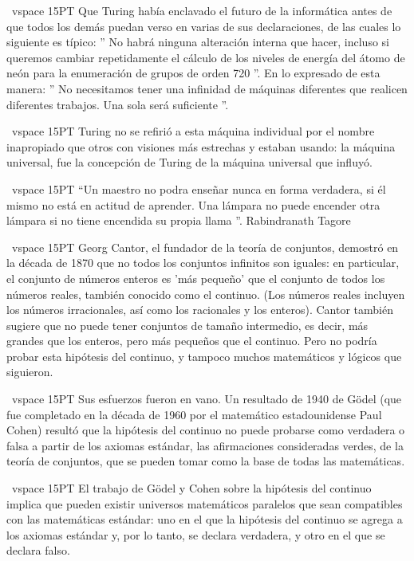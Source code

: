 \ vspace {15PT}
Que Turing había enclavado el futuro de la informática antes de que todos los demás puedan verso en varias de sus declaraciones, de las cuales lo siguiente es típico: '' No habrá ninguna alteración interna que hacer, incluso si queremos cambiar repetidamente el cálculo de los niveles de energía del átomo de neón para la enumeración de grupos de orden 720 ''. En lo expresado de esta manera: '' No necesitamos tener una infinidad de máquinas diferentes que realicen diferentes trabajos. Una sola será suficiente ''.

\ vspace {15PT}
 Turing no se refirió a esta máquina individual por el nombre inapropiado que otros con visiones más estrechas y estaban usando: la máquina universal, fue la concepción de Turing de la máquina universal que influyó. 

\ vspace {15PT}
“Un maestro no podra enseñar nunca en forma verdadera, si él mismo no está en actitud de aprender. Una lámpara no puede encender otra lámpara si no tiene encendida su propia llama ”. Rabindranath Tagore

\ vspace {15PT}
Georg Cantor, el fundador de la teoría de conjuntos, demostró en la década de 1870 que no todos los conjuntos infinitos son iguales: en particular, el conjunto de números enteros es 'más pequeño' que el conjunto de todos los números reales, también conocido como el continuo. (Los números reales incluyen los números irracionales, así como los racionales y los enteros). Cantor también sugiere que no puede tener conjuntos de tamaño intermedio, es decir, más grandes que los enteros, pero más pequeños que el continuo. Pero no podría probar esta hipótesis del continuo, y tampoco muchos matemáticos y lógicos que siguieron.

\ vspace {15PT}
Sus esfuerzos fueron en vano. Un resultado de 1940 de Gödel (que fue completado en la década de 1960 por el matemático estadounidense Paul Cohen) resultó que la hipótesis del continuo no puede probarse como verdadera o falsa a partir de los axiomas estándar, las afirmaciones consideradas verdes, de la teoría de conjuntos, que se pueden tomar como la base de todas las matemáticas.

\ vspace {15PT}
El trabajo de Gödel y Cohen sobre la hipótesis del continuo implica que pueden existir universos matemáticos paralelos que sean compatibles con las matemáticas estándar: uno en el que la hipótesis del continuo se agrega a los axiomas estándar y, por lo tanto, se declara verdadera, y otro en el que se declara falso.

